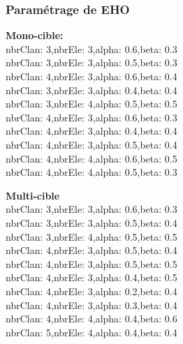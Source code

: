 \subsubsection{Paramétrage de EHO}
\noindent
\begin{minipage}[t]{0.55\textwidth}
	\textbf{Mono-cible:} \\
	nbrClan: 3,nbrEle: 3,alpha: 0.6,beta: 0.3\\
	nbrClan: 3,nbrEle: 3,alpha: 0.5,beta: 0.3\\
	nbrClan: 4,nbrEle: 3,alpha: 0.6,beta: 0.4\\
	nbrClan: 3,nbrEle: 3,alpha: 0.4,beta: 0.4\\
	nbrClan: 3,nbrEle: 4,alpha: 0.5,beta: 0.5\\
	nbrClan: 4,nbrEle: 3,alpha: 0.6,beta: 0.3\\
	nbrClan: 4,nbrEle: 3,alpha: 0.4,beta: 0.4\\
	nbrClan: 4,nbrEle: 3,alpha: 0.5,beta: 0.4\\
	nbrClan: 4,nbrEle: 4,alpha: 0.6,beta: 0.5\\
	nbrClan: 4,nbrEle: 4,alpha: 0.5,beta: 0.3\\
	
	
\end{minipage}\hfill
\hspace{0.2cm}
\begin{minipage}[t]{0.55\textwidth}
	\textbf{Multi-cible}\\
	nbrClan: 3,nbrEle: 3,alpha: 0.6,beta: 0.3\\
	nbrClan: 3,nbrEle: 3,alpha: 0.5,beta: 0.4\\
	nbrClan: 3,nbrEle: 4,alpha: 0.5,beta: 0.5\\
	nbrClan: 4,nbrEle: 3,alpha: 0.5,beta: 0.4\\
	nbrClan: 4,nbrEle: 3,alpha: 0.5,beta: 0.5\\
	nbrClan: 4,nbrEle: 3,alpha: 0.4,beta: 0.5\\
	nbrClan: 4,nbrEle: 3,alpha: 0.2,beta: 0.4\\
	nbrClan: 4,nbrEle: 3,alpha: 0.3,beta: 0.4\\
	nbrClan: 4,nbrEle: 4,alpha: 0.4,beta: 0.6\\
	nbrClan: 5,nbrEle: 4,alpha: 0.4,beta: 0.4\\
	
	
	
\end{minipage}\hfill


